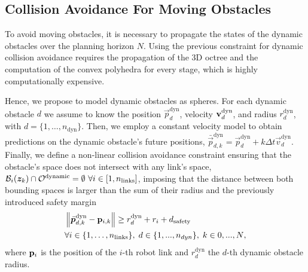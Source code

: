 \subsection{Collision Avoidance For Moving Obstacles}%
\label{sub:collision_avoidance_dynamic}
%
To avoid moving obstacles, it is necessary to propagate the states of the dynamic obstacles over the planning horizon $N$. Using the previous constraint for dynamic collision avoidance requires the propagation of the 3D octree and the computation of the convex polyhedra for every stage, which is highly computationally expensive. 

Hence, we propose to model dynamic obstacles as spheres. For each dynamic obstacle $d$ we assume to know the position 
$\vec{p}^{\textrm{dyn}}_{d}$, velocity $\mathbf{v}_{d}^{\textrm{dyn}}$, and radius $r_d^{\textrm{dyn}}$, with $d=\{1,\dots,n_{\textrm{dyn}}\}$. Then, we employ a constant velocity model to obtain predictions on the dynamic obstacle's future positions, $\bar{\vec{p}}^{\textrm{dyn}}_{d,k} = \vec{p}_{d}^{\textrm{dyn}} + k\Delta t\vec{v}_{d}^{\textrm{dyn}}$.
Finally, we define a non-linear collision avoidance constraint ensuring that the obstacle's space does not intersect with any link's space, %
$\mathcal{B}_i(\bm{z}_k) \cap\mathcal{O}^{\textrm{dynamic}}=\emptyset \,\, \forall i \in [1,n_{\textrm{links}}]$, imposing that the distance between both bounding spaces is larger than the sum of their radius and the previously introduced safety margin
\begin{equation}
  \begin{split}
  &\left\lVert\bar{\bm{p}}_{d,k}^{\textrm{dyn}} - \mathbf{p}_{i,k}\right\rVert  
    \geq r_d^{\textrm{dyn}} + r_i + d_{\textrm{safety}}  \\ &\forall i \in\{1,\dots,n_{\textrm{links}}\},\; d\in\{1,...,n_{dyn}\},\;k\in{0,...,N},
  \end{split}
\end{equation}
where $\mathbf{p}_{i}$ is the position of the $i$-th robot link and $r_d^{\textrm{dyn}}$ the $d$-th dynamic obstacle radius.


